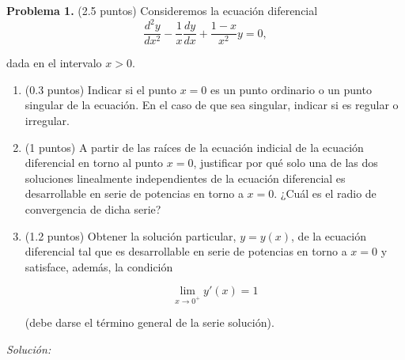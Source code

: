 \textbf{Problema 1.} (2.5 puntos) Consideremos la ecuación diferencial
\begin{equation*}
    \frac{d^2 y}{dx^2} - \frac{1}{x}\frac{dy}{dx} + \frac{1-x}{x^2}{y} = 0,
\end{equation*}

dada en el intervalo $x > 0$.

\begin{enumerate}
[label=(\alph*)]
    \item (0.3 puntos) Indicar si el punto $x = 0$ es un punto ordinario o un punto singular de la
    ecuación. En el caso de que sea singular, indicar si es regular o irregular.
    \item (1 puntos) A partir de las raíces de la ecuación indicial de la ecuación diferencial en torno
    al punto $x = 0$, justificar por qué solo una de las dos soluciones linealmente independientes
    de la ecuación diferencial es desarrollable en serie de potencias en torno a $x = 0$. ¿Cuál es
    el radio de convergencia de dicha serie?
    \item (1.2 puntos) Obtener la solución particular, $y = y(x)$, de la ecuación diferencial tal que es
    desarrollable en serie de potencias en torno a $x = 0$ y satisface, además, la condición

    \begin{equation*}
        \lim_{x \rightarrow 0^+} y'(x) = 1
    \end{equation*}

    (debe darse el término general de la serie solución).
\end{enumerate}


\vspace{20px}
\textit{Solución:}
\\

